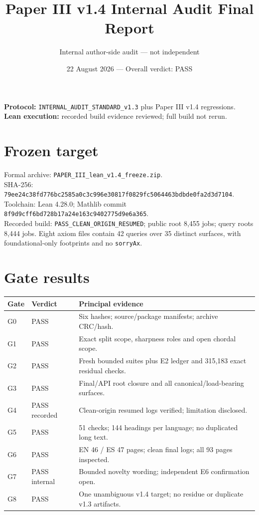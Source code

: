 \documentclass[11pt]{article}
\title{Paper III v1.4 Internal Audit Final Report}
\author{Internal author-side audit --- not independent}
\date{22 August 2026 --- Overall verdict: PASS}
\begin{document}
\maketitle
\textbf{Protocol:} \texttt{INTERNAL\_AUDIT\_STANDARD\_v1.3} plus Paper III v1.4 regressions.\\
\textbf{Lean execution:} recorded build evidence reviewed; full build not rerun.

\section{Frozen target}
Formal archive: \texttt{PAPER\_III\_lean\_v1.4\_freeze.zip}.\\
SHA-256:\\
{\small\nolinkurl{79ee24c38fd776bc2585a0c3c996e30817f0829fc5064463bdbde0fa2d3d7104}}.\\
Toolchain: Lean 4.28.0; Mathlib commit
\nolinkurl{8f9d9cff6bd728b17a24e163c9402775d9e6a365}.\\
Recorded build: \texttt{PASS\_CLEAN\_ORIGIN\_RESUMED}; public root 8,455 jobs;
query roots 8,444 jobs. Eight axiom files contain 42 queries over 35 distinct
surfaces, with foundational-only footprints and no \texttt{sorryAx}.

\clearpage
\section{Gate results}
\begin{longtable}{p{.16\linewidth}p{.22\linewidth}p{.52\linewidth}}
\toprule Gate & Verdict & Principal evidence \\ \midrule
G0 & PASS & Six hashes; source/package manifests; archive CRC/hash. \\
G1 & PASS & Exact split scope, sharpness roles and open chordal scope. \\
G2 & PASS & Fresh bounded suites plus E2 ledger and 315,183 exact residual checks. \\
G3 & PASS & Final/API root closure and all canonical/load-bearing surfaces. \\
G4 & PASS recorded & Clean-origin resumed logs verified; limitation disclosed. \\
G5 & PASS & 51 checks; 144 headings per language; no duplicated long text. \\
G6 & PASS & EN 46 / ES 47 pages; clean final logs; all 93 pages inspected. \\
G7 & PASS internal & Bounded novelty wording; independent E6 confirmation open. \\
G8 & PASS & One unambiguous v1.4 target; no residue or duplicate v1.3 artifacts. \\
\bottomrule
\end{longtable}
\end{document}
